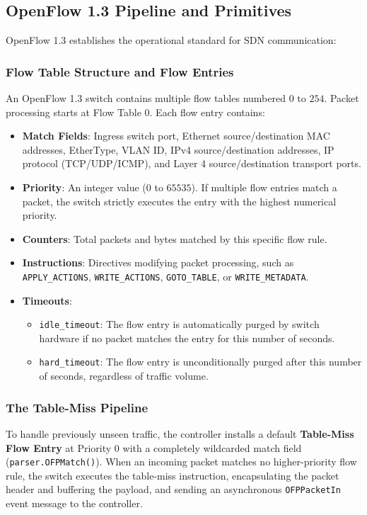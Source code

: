 \documentclass[12pt,a4paper,oneside]{report}
\begin{document}
\subsection{OpenFlow 1.3 Pipeline and Primitives}
OpenFlow 1.3 \cite{onf2012openflow} establishes the operational standard for SDN communication:

\subsubsection{Flow Table Structure and Flow Entries}
An OpenFlow 1.3 switch contains multiple flow tables numbered $0$ to $254$. Packet processing starts at Flow Table 0. Each flow entry contains:
\begin{itemize}
    \item \textbf{Match Fields}: Ingress switch port, Ethernet source/destination MAC addresses, EtherType, VLAN ID, IPv4 source/destination addresses, IP protocol (TCP/UDP/ICMP), and Layer 4 source/destination transport ports.
    \item \textbf{Priority}: An integer value ($0$ to $65535$). If multiple flow entries match a packet, the switch strictly executes the entry with the highest numerical priority.
    \item \textbf{Counters}: Total packets and bytes matched by this specific flow rule.
    \item \textbf{Instructions}: Directives modifying packet processing, such as \texttt{APPLY\_ACTIONS}, \texttt{WRITE\_ACTIONS}, \texttt{GOTO\_TABLE}, or \texttt{WRITE\_METADATA}.
    \item \textbf{Timeouts}:
    \begin{itemize}
        \item \texttt{idle\_timeout}: The flow entry is automatically purged by switch hardware if no packet matches the entry for this number of seconds.
        \item \texttt{hard\_timeout}: The flow entry is unconditionally purged after this number of seconds, regardless of traffic volume.
    \end{itemize}
\end{itemize}

\subsubsection{The Table-Miss Pipeline}
To handle previously unseen traffic, the controller installs a default \textbf{Table-Miss Flow Entry} at Priority 0 with a completely wildcarded match field (\texttt{parser.OFPMatch()}). When an incoming packet matches no higher-priority flow rule, the switch executes the table-miss instruction, encapsulating the packet header and buffering the payload, and sending an asynchronous \texttt{OFPPacketIn} event message to the controller.
\end{document}
